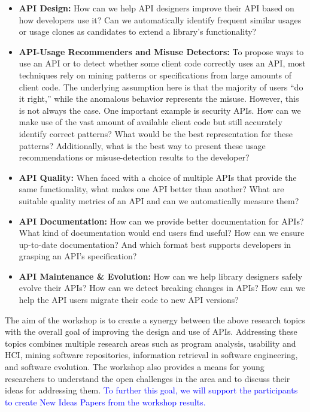 \documentclass[10pt, conference]{IEEEtran}
\newcommand{\updated}[1]{{\textcolor{blue}{#1}}}
\begin{document}
\begin{itemize}
\setlength\itemsep{5pt}

\item \textbf{API Design:} How can we help API designers improve their API based on how developers use it? Can we automatically identify frequent similar usages or usage clones as candidates to extend a library's functionality?

\item \textbf{API-Usage Recommenders and Misuse Detectors:} To propose ways to use an API or to detect whether some client code correctly uses an API, most techniques rely on mining patterns or specifications from large amounts of client code. The underlying assumption here is that the majority of users ``do it right,'' while the anomalous behavior represents the misuse. However, this is not always the case. One important example is security APIs. How can we make use of the vast amount of available client code but still accurately identify correct patterns? What would be the best representation for these patterns? Additionally, what is the best way to present these usage recommendations or misuse-detection results to the developer? 

\item \textbf{API Quality:} When faced with a choice of multiple APIs that provide the same functionality, what makes one API better than another? What are suitable quality metrics of an API and can we automatically measure them?

\item\textbf{API Documentation:} How can we provide better documentation for APIs? What kind of documentation would end users find useful? How can we ensure up-to-date documentation? And which format best supports developers in grasping an API's specification?

\item \textbf{API Maintenance \& Evolution:} How can we help library designers safely evolve their APIs? How can we detect breaking changes in APIs? How can we help the API users migrate their code to new API versions?

\end{itemize}

The aim of the workshop is to create a synergy between the above research topics with the overall goal of improving the design and use of APIs. Addressing these topics combines multiple research areas such as program analysis, usability and HCI, mining software repositories, information retrieval in software engineering, and software evolution.
The workshop also provides a means for young researchers to understand the open challenges in the area and to discuss their ideas for addressing them.
\updated{To further this goal, we will support the participants to create New Ideas Papers from the workshop results.}
\end{document}
